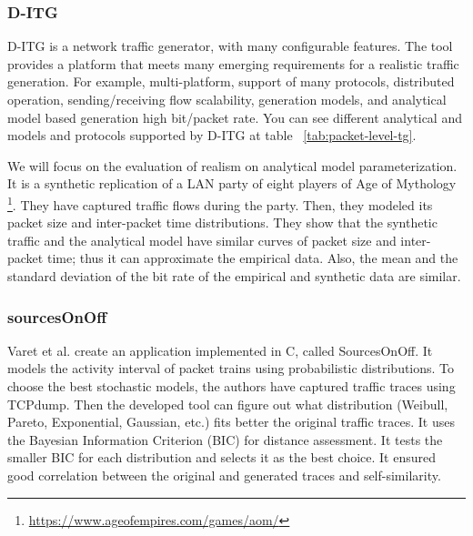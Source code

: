 \subsubsection{D-ITG}

D-ITG\cite{ditg-paper} is a network traffic generator, with many configurable features. The tool provides a platform that meets many emerging requirements for a realistic traffic generation. For example, multi-platform, support of many protocols, distributed operation, sending/receiving flow scalability, generation models, and analytical model based generation high bit/packet rate. You can see different analytical and models and protocols supported by D-ITG at table ~\ref{tab:packet-level-tg}. 

We will focus on the evaluation of realism on analytical model parameterization.  It is a synthetic replication of a LAN party of eight players of Age of Mythology \footnote{\href{https://www.ageofempires.com/games/aom/}{https://www.ageofempires.com/games/aom/}}. They have captured traffic flows during the party. Then, they modeled its packet size and inter-packet time distributions. They show that the synthetic traffic and the analytical model have similar curves of packet size and inter-packet time; thus it can approximate the empirical data. Also, the mean and the standard deviation of the bit rate of the empirical and synthetic data are similar. 


\subsubsection{sourcesOnOff}


Varet et al. \cite{sourcesonoff-paper} create an application implemented in C, called SourcesOnOff. It models the activity interval of packet trains using probabilistic distributions. To choose the best stochastic models, the authors have captured traffic traces using TCPdump. Then the developed tool can figure out what distribution (Weibull, Pareto, Exponential, Gaussian, etc.) fits better the original traffic traces. It uses the Bayesian Information Criterion (BIC) for distance assessment. It tests the smaller BIC for each distribution and selects it as the best choice. It ensured good correlation between the original and generated traces and self-similarity.

